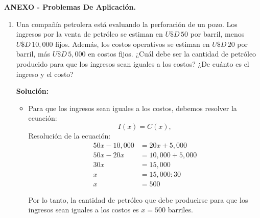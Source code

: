 \documentclass[11pt]{article}
\begin{document}
\newpage
\textbf{ANEXO - Problemas De Aplicación.}
\begin{enumerate}[\hspace{-7mm} 1) ]
\item Una compañía petrolera está evaluando la perforación de un pozo. Los ingresos por la venta de petróleo se estiman en \( U\$D \,50 \) por barril, menos \( U\$D \,10,000 \) fijos. Además, los costos operativos se estiman en \( U\$D \,20 \) por barril, más \( U\$D \,5,000 \) en costos fijos. ¿Cuál debe ser la cantidad de petróleo producido para que los ingresos sean iguales a los costos? ¿De cuánto es el ingreso y el costo?


\medskip


\textbf{Solución:} 

\medskip 



\begin{itemize} 
    donde $ x $ es la cantidad de barriles de petróleo producidos.

\bigskip

    \item Para que los ingresos sean iguales a los costos, debemos resolver la ecuación:   $$I(x) = C(x),$$ Resolución de la ecuación: \vspace{-6mm}
    \begin{align*}
        50x - 10,000 &= 20x + 5,000
        \\
        50x - 20x &= 10,000 + 5,000
        \\
        30x &= 15,000
        \\
        x &=  15,000: 30 
        \\
        x &= 500
    \end{align*}

    
    

    Por lo tanto, la cantidad de petróleo que debe producirse para que los ingresos sean iguales a los costos es $ x = 500 $ barriles.


\bigskip



\end{itemize}
\end{enumerate}
\end{document}
